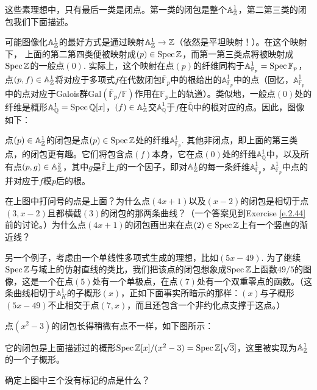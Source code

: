 这些素理想中，只有最后一类是闭点。第一类的闭包是整个$\mathbb{A}_{\mathbb{Z}}^1$，第二第三类的闭包我们下面描述。

可能图像化$\mathbb{A}_{\mathbb{Z}}^1$的最好方式是通过映射$\mathbb{A}_{\mathbb{Z}}^1\to\mathbb{Z}$（依然是平坦映射！）。在这个映射下， 上面的第二第四类便被映射成$(p)\in\operatorname{Spec} \mathbb{Z}$，而第一第三类点将被映射成$\operatorname{Spec} \mathbb{Z}$的一般点$(0)$. 实际上，这个映射在点$(p)$的纤维同构于$\mathbb{A}_{\mathbb{F}_p}^1=\operatorname{Spec} \mathbb{F}_p$，点$(p,f)\in\mathbb{A}_{\mathbb{Z}}^1$将对应于多项式$f$在代数闭包$\bar{\mathbb{F}}_p$中的根给出的$\mathbb{A}_{\mathbb{F}_p}^1$中的点（回忆，$\mathbb{A}_{\mathbb{F}_p}^1$中的点对应于Galois群$\mathrm{Gal}\left(\bar{\mathbb{F}}_p/\mathbb{F}\right)$作用在$\mathbb{F}_p$上的轨道）。类似地，一般点$(0)$处的纤维是概形$\mathbb{A}_\mathbb{Q}^1=\operatorname{Spec} \mathbb{Q}[x]$，$(f)\in\mathbb{A}_{\mathbb{Z}}^1$交$\mathbb{A}_\mathbb{Q}^1$于$f$在$\bar{\mathbb{Q}}$中的根对应的点。因此，图像如下：

\label{p.2.18}

点$(p)\in\mathbb{A}_{\mathbb{Z}}^1$的闭包是点$(p)\in \operatorname{Spec} \mathbb{Z}$处的纤维$\mathbb{A}_{\mathbb{F}_p}^1$. 其他非闭点，即上面的第三类点，的闭包更有趣。它们将包含点$(f)$本身，它在点$(0)$处的纤维$\mathbb{A}_\mathbb{Q}^1$中，以及所有点$(p,g)\in\mathbb{A}_{\mathbb{Z}}^2$，其中$g$是$\bar{\mathbb{F}}$上$f$的一个因子，即对$\mathbb{A}_{\mathbb{Z}}^1$的每一条纤维$\mathbb{A}_{\mathbb{F}_p}^1$，$\mathbb{A}_{\mathbb{F}_p}^1$中点的并对应于$f$模$p$后的根。

\begin{exe}
	在上图中打问号的点是上面？为什么点$(4x+1)$以及$(x-2)$的闭包是相切于点$(3,x-2)$且都横截$(3)$的闭包的那两条曲线？（一个答案见到Exercise \ref{e.2.44}前的讨论。）为什么点$(4x+1)$的闭包画出来在点$(2)\in\operatorname{Spec} \mathbb{Z}$上有一个竖直的渐近线？
\end{exe}

另一个例子，考虑由一个单线性多项式生成的理想，比如$(5x-49)$. 为了继续$\operatorname{Spec} \mathbb{Z}$与域上的仿射直线的类比，我们把该点的闭包想象成$\operatorname{Spec}\mathbb{Z}$上函数$49/5$的图像，这是一个在点$(5)$处有一个单极点，在点$(7)$处有一个双重零点的函数。（这条曲线相切于$\mathbb{A}_K^1$的子概形$(x)$，正如下面事实所暗示的那样：$(x)$与子概形$(5x-49)$不止相交于点$(7,x)$，而且还包含一个非约化点支撑于这点。）

点$(x^2-3)$的闭包长得稍微有点不一样，如下图所示：


\noindent 它的闭包是上面描述过的概形$\operatorname{Spec} \mathbb{Z}[x]/(x^2-3)=\operatorname{Spec} \mathbb{Z}[\sqrt 3]$，这里被实现为$\mathbb{A}_{\mathbb{Z}}^1$的一个子概形。

\begin{exe}
	确定上图中三个没有标记的点是什么？
\end{exe}

